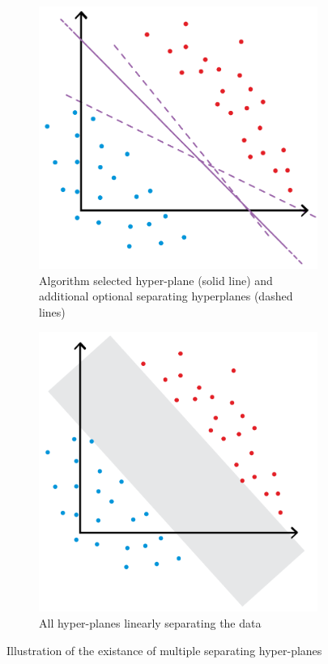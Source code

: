 \begin{figure}[h!]
	\centering
	\begin{subfigure}[t]{0.35\textwidth}
		\centering
		\includegraphics[width=\linewidth]{chapters/classification/figures/3_3.png}
		\caption{Algorithm selected hyper-plane (solid line) and additional optional separating hyperplanes (dashed lines)}
	\end{subfigure}
	\hspace{10mm}
	\begin{subfigure}[t]{0.35\textwidth}
		\centering
		\includegraphics[width=\linewidth]{chapters/classification/figures/3_4.png}
		\caption{All hyper-planes linearly separating the data}
	\end{subfigure}
	\caption{Illustration of the existance of multiple separating hyper-planes}
	\label{fig:multiple_hyperplanes}
\end{figure}



